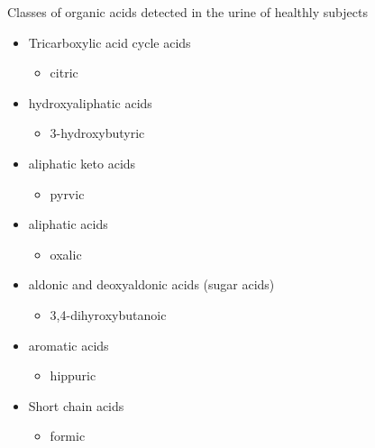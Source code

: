 \documentclass[presentation]{beamer}
\begin{document}
\begin{frame}[label={sec:orgheadline5}]{Classes of organic acids detected in the urine of  healthly subjects}
\begin{itemize}
\item Tricarboxylic acid cycle acids
\begin{itemize}
\item citric
\end{itemize}
\item hydroxyaliphatic acids
\begin{itemize}
\item 3-hydroxybutyric
\end{itemize}
\item aliphatic keto acids
\begin{itemize}
\item pyrvic
\end{itemize}
\item aliphatic acids
\begin{itemize}
\item oxalic
\end{itemize}
\item aldonic and deoxyaldonic acids (sugar acids)
\begin{itemize}
\item 3,4-dihyroxybutanoic
\end{itemize}
\item aromatic acids
\begin{itemize}
\item hippuric
\end{itemize}
\item Short chain acids
\begin{itemize}
\item formic
\end{itemize}
\end{itemize}
\end{frame}
\end{document}
